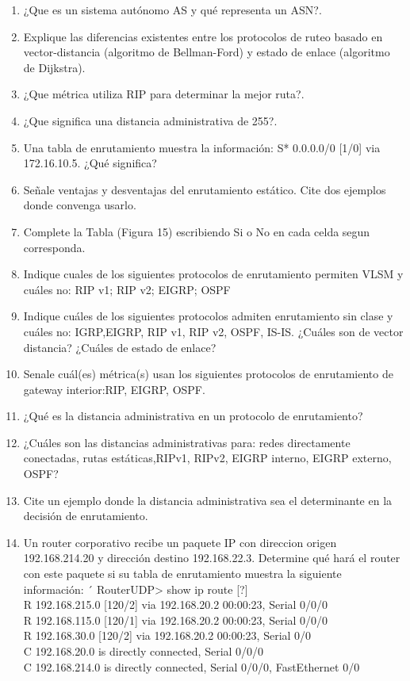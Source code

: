 \documentclass{udparticle}
\begin{document}
\begin{enumerate}
\item ¿Que es un sistema autónomo AS y qué representa un ASN?.
\item Explique las diferencias existentes entre los protocolos de ruteo basado en
vector-distancia (algoritmo de Bellman-Ford) y estado de enlace (algoritmo de Dijkstra).

\item ¿Que métrica utiliza RIP para determinar la mejor ruta?.
\item ¿Que significa una distancia administrativa de 255?.
\item Una tabla de enrutamiento muestra la información: S* 0.0.0.0/0 [1/0] via 172.16.10.5. ¿Qué significa?
\item Señale ventajas y desventajas del enrutamiento estático. Cite dos ejemplos donde convenga usarlo.
\item Complete la Tabla (Figura 15) escribiendo Si o No en cada celda segun corresponda.

\item Indique cuales de los siguientes protocolos de enrutamiento permiten VLSM y 
cuáles no: RIP v1; RIP v2; EIGRP; OSPF
\item Indique cuáles de los siguientes protocolos admiten enrutamiento sin clase y 
cuáles no: IGRP,EIGRP, RIP v1, RIP v2, OSPF, IS-IS. ¿Cuáles son de vector 
distancia? ¿Cuáles de estado de enlace?
\item Senale cuál(es) métrica(s) usan los siguientes protocolos de enrutamiento de gateway interior:RIP, EIGRP, OSPF.
\item ¿Qué es la distancia administrativa en un protocolo de enrutamiento?
\item ¿Cuáles son las distancias administrativas para: redes directamente conectadas, rutas estáticas,RIPv1, RIPv2, EIGRP interno, EIGRP externo, OSPF?
\item Cite un ejemplo donde la distancia administrativa sea el determinante en la decisión de enrutamiento.
\item Un router corporativo recibe un paquete IP con direccion origen 
192.168.214.20 y dirección destino 192.168.22.3. Determine qué hará el router con este paquete si su tabla de enrutamiento muestra la siguiente información: ´
RouterUDP> show ip route [?]\\
R 192.168.215.0 [120/2] via 192.168.20.2 00:00:23, Serial 0/0/0\\
R 192.168.115.0 [120/1] via 192.168.20.2 00:00:23, Serial 0/0/0\\
R 192.168.30.0 [120/2] via 192.168.20.2 00:00:23, Serial 0/0\\
C 192.168.20.0 is directly connected, Serial 0/0/0\\
C 192.168.214.0 is directly connected, Serial 0/0/0, FastEthernet 0/0\\


\end{enumerate}
\end{document}

